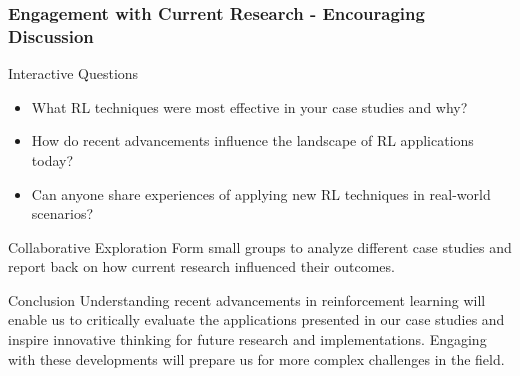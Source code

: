 \documentclass[aspectratio=169]{beamer}
\begin{document}
\begin{frame}[fragile]
    \frametitle{Engagement with Current Research - Encouraging Discussion}
    \begin{block}{Interactive Questions}
        \begin{itemize}
            \item What RL techniques were most effective in your case studies and why?
            \item How do recent advancements influence the landscape of RL applications today?
            \item Can anyone share experiences of applying new RL techniques in real-world scenarios?
        \end{itemize}
    \end{block}

    \begin{block}{Collaborative Exploration}
        Form small groups to analyze different case studies and report back on how current research influenced their outcomes.
    \end{block}

    \begin{block}{Conclusion}
        Understanding recent advancements in reinforcement learning will enable us to critically evaluate the applications presented in our case studies and inspire innovative thinking for future research and implementations. Engaging with these developments will prepare us for more complex challenges in the field.
    \end{block}
\end{frame}
\end{document}
